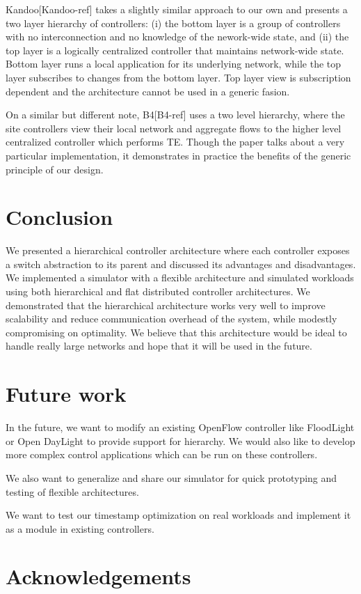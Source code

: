 \documentclass[10pt, twocolumn]{article}
\begin{document}
Kandoo[Kandoo-ref] takes a slightly similar approach to our own and presents a two layer hierarchy of controllers: (i) the bottom layer is a group of controllers with no interconnection and no knowledge of the nework-wide state, and (ii) the top layer is a logically centralized controller that maintains network-wide state. Bottom layer runs a local application for its underlying network, while the top layer subscribes to changes from the bottom layer. Top layer view is subscription dependent and the architecture cannot be used in a generic fasion.

On a similar but different note, B4[B4-ref] uses a two level hierarchy, where the site controllers view their local network and aggregate flows to the higher level centralized controller which performs TE. Though the paper talks about a very particular implementation, it demonstrates in practice the benefits of the generic principle of our design.

\section{Conclusion}
\label{sec:conc}
We presented a hierarchical controller architecture where each controller exposes a switch abstraction to its parent and discussed its advantages and disadvantages. We implemented a simulator with a flexible architecture and simulated workloads using both hierarchical and flat distributed controller architectures. We demonstrated that the hierarchical architecture works very well to improve scalability and reduce communication overhead of the system, while modestly compromising on optimality. We believe that this architecture would be ideal to handle really large networks and hope that it will be used in the future.

\section{Future work}
\label{sec:future}
In the future, we want to modify an existing OpenFlow controller like FloodLight or Open DayLight to provide support for hierarchy. We would also like to develop more complex control applications which can be run on these controllers.

We also want to generalize and share our simulator for quick prototyping and testing of flexible architectures.

We want to test our timestamp optimization on real workloads and implement it as a module in existing controllers.

\section{Acknowledgements}
\label{sec:ack}
\nocite{*}



\end{document}
